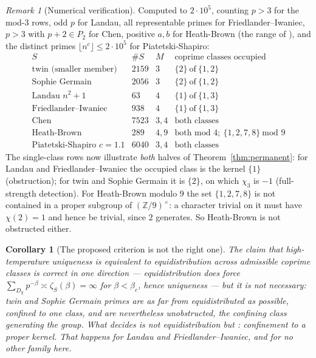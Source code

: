 \documentclass[11pt]{amsart}
\numberwithin{equation}{section}
\newtheorem{corollary}[theorem]{Corollary}
\theoremstyle{definition}
\theoremstyle{remark}
\newtheorem{remark}[theorem]{Remark}
\newcommand{\Z}{\mathbb{Z}}
\begin{document}
\begin{remark}[Numerical verification]\label{rem:numver}
Computed to $2\cdot10^5$, counting $p>3$ for the mod-$3$ rows, odd $p$ for Landau, all
representable primes for Friedlander--Iwaniec, $p>3$ with $p+2\in P_2$ for Chen, positive
$a,b$ for Heath-Brown (the range of \cite{HB}), and the distinct primes
$\lfloor n^c\rfloor\le2\cdot10^5$ for Piatetski-Shapiro:
\[
\begin{array}{lrcl}
S & \#S & M & \text{coprime classes occupied}\\\hline
\text{twin (smaller member)} & 2159 & 3 & \{2\}\ \text{of}\ \{1,2\}\\
\text{Sophie Germain} & 2056 & 3 & \{2\}\ \text{of}\ \{1,2\}\\
\text{Landau }n^2+1 & 63 & 4 & \{1\}\ \text{of}\ \{1,3\}\\
\text{Friedlander--Iwaniec} & 938 & 4 & \{1\}\ \text{of}\ \{1,3\}\\
\text{Chen} & 7523 & 3,4 & \text{both classes}\\
\text{Heath-Brown} & 289 & 4,9 & \text{both mod }4;\ \{1,2,7,8\}\ \text{mod }9\\
\text{Piatetski-Shapiro }c=1.1 & 6040 & 3,4 & \text{both classes}
\end{array}
\]
The single-class rows now illustrate \emph{both} halves of Theorem~\ref{thm:permanent}:
for Landau and Friedlander--Iwaniec the occupied class is the kernel $\{1\}$
(obstruction); for twin and Sophie Germain it is $\{2\}$, on which $\chi_3$ is $-1$
(full-strength detection). For Heath-Brown modulo $9$ the set $\{1,2,7,8\}$ is not
contained in a proper subgroup of
$(\Z/9)^\times$: a character trivial on it must have $\chi(2)=1$ and hence be trivial, since
$2$ generates. So Heath-Brown is not obstructed either.
\end{remark}

\begin{corollary}[The proposed criterion is not the right one]\label{cor:criterion}
The claim that high-temperature uniqueness is equivalent to equidistribution across
admissible coprime classes is correct in one direction --- equidistribution does force
$\sum_{D_\chi}p^{-\beta}\asymp\zeta_S(\beta)=\infty$ for $\beta<\beta_c$, hence uniqueness ---
but it is not necessary: twin and Sophie Germain primes are as far from equidistributed as
possible, confined to one class, and are nevertheless unobstructed, the confining class
generating the group. What decides is not equidistribution but
\cite[Thm.~5.5(5)]{Main}: confinement to a proper \emph{kernel}. That happens for Landau
and Friedlander--Iwaniec, and for no other family here.
\end{corollary}
\end{document}
